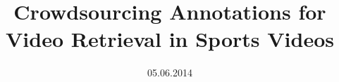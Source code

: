 \documentclass[a4paper, 10pt, oneside]{memoir}
\title				{Crowdsourcing Annotations for Video Retrieval in Sports Videos}
\date				{05.06.2014}
\begin{document}
\thesisfront
\maketitle
\pagestyle{thesis}



\thesistoc
\thesismain







%
\thesisappendix
\thesisbib
\begin{appendices}
	 
\end{appendices}
\thesisback
%

%
\end{document}

